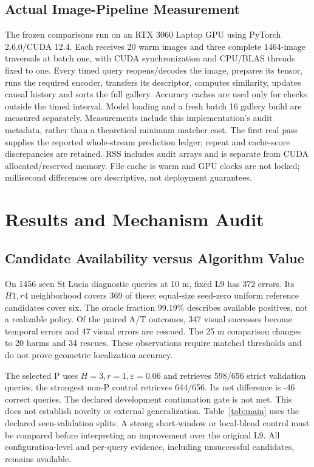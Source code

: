 \documentclass[conference]{IEEEtran}
\begin{document}
\subsection{Actual Image-Pipeline Measurement}
The frozen comparisons run on an RTX 3060 Laptop GPU using PyTorch 2.6.0/CUDA 12.4. Each receives 20 warm images and three complete 1464-image traversals at batch one, with CUDA synchronization and CPU/BLAS threads fixed to one. Every timed query reopens/decodes the image, prepares its tensor, runs the required encoder, transfers its descriptor, computes similarity, updates causal history and sorts the full gallery. Accuracy caches are used only for checks outside the timed interval. Model loading and a fresh batch 16 gallery build are measured separately. Measurements include this implementation's audit metadata, rather than a theoretical minimum matcher cost. The first real pass supplies the reported whole-stream prediction ledger; repeat and cache-score discrepancies are retained. RSS includes audit arrays and is separate from CUDA allocated/reserved memory. File cache is warm and GPU clocks are not locked; millisecond differences are descriptive, not deployment guarantees.

\section{Results and Mechanism Audit}
\subsection{Candidate Availability versus Algorithm Value}
On 1456 seen St Lucia diagnostic queries at 10 m, fixed L9 has 372 errors. Its $H1,r4$ neighborhood covers 369 of these; equal-size seed-zero uniform reference candidates cover six. The oracle fraction 99.19\% describes available positives, not a realizable policy. Of the paired A/T outcomes, 347 visual successes become temporal errors and 47 visual errors are rescued. The 25 m comparison changes to 20 harms and 34 rescues. These observations require matched thresholds and do not prove geometric localization accuracy.

The selected P uses $H=3,r=1,\varepsilon=0.06$ and retrieves 598/656 strict validation queries; the strongest non-P control retrieves 644/656. Its net difference is -46 correct queries. The declared development continuation gate is not met. This does not establish novelty or external generalization. Table~\ref{tab:main} uses the declared seen-validation splits. A strong short-window or local-blend control must be compared before interpreting an improvement over the original L9. All configuration-level and per-query evidence, including unsuccessful candidates, remains available.
\end{document}
